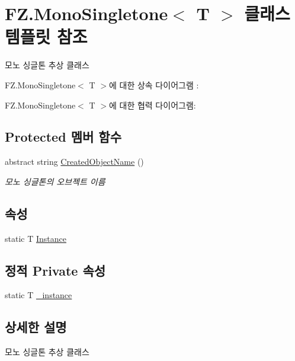 \hypertarget{class_f_z_1_1_mono_singletone}{}\section{F\+Z.\+Mono\+Singletone$<$ T $>$ 클래스 템플릿 참조}
\label{class_f_z_1_1_mono_singletone}


모노 싱글톤 추상 클래스  




F\+Z.\+Mono\+Singletone$<$ T $>$에 대한 상속 다이어그램 \+: 


F\+Z.\+Mono\+Singletone$<$ T $>$에 대한 협력 다이어그램\+:
\subsection*{Protected 멤버 함수}
\begin{DoxyCompactItemize}
\item 
abstract string \hyperlink{class_f_z_1_1_mono_singletone_acc57ab6be46d2b0d7cd9ee4eb5df2b38}{Created\+Object\+Name} ()
\begin{DoxyCompactList}\small\item\em 모노 싱글톤의 오브젝트 이름 \end{DoxyCompactList}\end{DoxyCompactItemize}
\subsection*{속성}
\begin{DoxyCompactItemize}
\item 
static T \hyperlink{class_f_z_1_1_mono_singletone_a39e34129d25a9664576949259e7dfd5f}{Instance}
\end{DoxyCompactItemize}
\subsection*{정적 Private 속성}
\begin{DoxyCompactItemize}
\item 
static T \hyperlink{class_f_z_1_1_mono_singletone_ad6822c95bf3a117cd4cceb793eef5ed7}{\+\_\+instance}
\end{DoxyCompactItemize}


\subsection{상세한 설명}
모노 싱글톤 추상 클래스 

